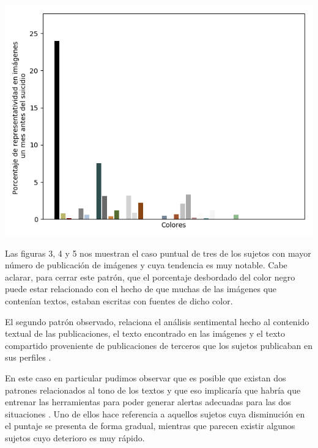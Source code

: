 \documentclass[12pt, man, donotrepeattitle, letterpaper]{apa6}
\begin{document}
\begin{center}
\begin{minipage}{0.3\linewidth}
        \end{minipage}
        \begin{minipage}{0.3\linewidth}
            \includegraphics[width=\linewidth]{images/colors_gabriel}
        \end{minipage}
    \end{center}
    
    Las figuras 3, 4 y 5 nos muestran el caso puntual de tres de los sujetos con mayor número de publicación de imágenes y cuya tendencia es muy notable. Cabe aclarar, para cerrar este patrón, que el porcentaje desbordado del color negro puede estar relacionado con el hecho de que muchas de las imágenes que contenían textos, estaban escritas con fuentes de dicho color.
    
    El segundo patrón observado, relaciona el análisis sentimental hecho al contenido textual de las publicaciones, el texto encontrado en las imágenes y el texto compartido proveniente de publicaciones de terceros que los sujetos publicaban en sus perfiles \parencite{Twitter}.
    
    En este caso en particular pudimos observar que es posible que existan dos patrones relacionados al tono de los textos y que eso implicaría que habría que entrenar las herramientas para poder generar alertas adecuadas para las dos situaciones \parencite{TextAnalysis}. Uno de ellos hace referencia a aquellos sujetos cuya disminución en el puntaje se presenta de forma gradual, mientras que parecen existir algunos sujetos cuyo deterioro es muy rápido.
    
\end{document}
